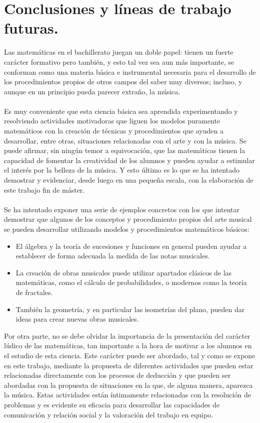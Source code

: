 \documentclass[a4paper, openright, 11pt, titlepage]{report}
\theoremstyle{definition}\newtheorem{defin}[propo]{Definition}
\theoremstyle{definition}\newtheorem{obser}[propo]{Remark}
\theoremstyle{definition}\newtheorem{ejem}[propo]{Ejemplo}
\theoremstyle{definition}\newtheorem{algoritmo}[propo]{Algoritmo}
\begin{document}
\chapter{Conclusiones y líneas de trabajo futuras.}
Las matemáticas en el bachillerato juegan un doble papel: tienen un fuerte carácter formativo pero también, y esto tal vez sea aun más importante, se conforman como una materia básica e instrumental necesaria para el desarrollo de los procedimientos propios de otros campos del saber muy diversos; incluso, y aunque en un principio pueda parecer extraño, la música.\\\\
Es muy conveniente que esta ciencia básica sea aprendida experimentando y resolviendo actividades motivadoras que liguen los modelos puramente matemáticos con la creación de técnicas y procedimientos que ayuden a desarrollar, entre otras, situaciones relacionadas con el arte y con la música. Se puede afirmar, sin ningún temor a equivocación, que las matemáticas tienen la capacidad de fomentar la creatividad de los alumnos y pueden ayudar a estimular el interés por la belleza de la música. Y esto último es lo que se ha intentado demostrar y evidenciar, desde luego en una pequeña escala, con la elaboración de este trabajo fin de máster.\\\\
Se ha intentado exponer una serie de ejemplos concretos con los que intentar demostrar que algunos de los conceptos y procedimiento propios del arte musical se pueden desarrollar utilizando modelos y procedimientos matemáticos básicos:
\begin{itemize}
    \item El álgebra y la teoría de sucesiones y funciones en general pueden ayudar a establecer de forma adecuada la medida de las notas musicales.
    \item La creación de obras musicales puede utilizar apartados clásicos de las matemáticas, como el cálculo de probabilidades, o modernos como la teoría de fractales.
    \item También la geometría, y en particular las isometrías del plano, pueden dar ideas para crear nuevas obras musicales.
\end{itemize}
Por otra parte, no se debe olvidar la importancia de la presentación del carácter lúdico de las matemáticas, tan importante a la hora de motivar a los alumnos en el estudio de esta ciencia. Este carácter puede ser abordado, tal y como se expone en este trabajo, mediante la propuesta de diferentes actividades que pueden estar relacionadas directamente con los procesos de deducción y que pueden ser abordadas con la propuesta de situaciones en la que, de alguna manera, aparezca la música. Estas actividades están íntimamente relacionadas con la resolución de problemas y es evidente su eficacia para desarrollar las capacidades de comunicación y relación social y la valoración del trabajo en equipo.\\\\
\end{document}
